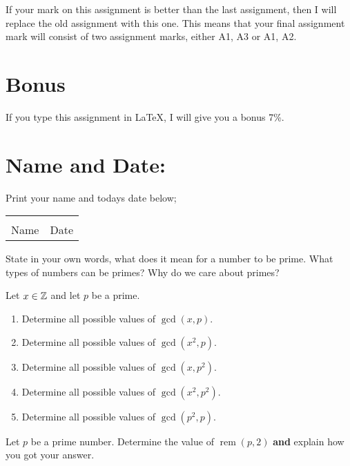 \documentclass[12pt]{article} %
\begin{document}
  If your mark on this assignment is better than the last assignment, then I will replace the old assignment with
  this one. This means that your final assignment mark will consist of two assignment marks, either A1, A3 or A1,
  A2.

  \section{Bonus}
  If you type this assignment in \LaTeX, I will give you a bonus 7\%.
  
\section{Name and Date:}
	Print your name and todays date below;\\


	\begin{center}
	\noindent\begin{tabular}{ll}
		\makebox[3in]{\hrulefill} & \makebox[3in]{\hrulefill}\\
		Name & Date\\[8ex]%
	\end{tabular}
	\end{center}
	\newpage

  \begin{qstn}
    State in your own words, what does it mean for a number to be prime. What types of numbers can be primes? Why
    do we care about primes?
  \end{qstn}

  \begin{qstn}
    Let $x \in \mathbb Z$ and let $p$ be a prime.
    \begin{enumerate}[label=(\alph*)]
      \item Determine all possible values of $\gcd (x,p)$.
      \item Determine all possible values of $\gcd (x^2,p)$.
      \item Determine all possible values of $\gcd (x,p^2)$.
      \item Determine all possible values of $\gcd (x^2,p^2)$.
      \item Determine all possible values of $\gcd (p^2,p)$.
    \end{enumerate}
  \end{qstn}

  \begin{qstn}
    Let $p$ be a prime number. Determine the value of $ \operatorname{rem}(p,2)$ \textbf{and} explain how you got
    your answer.
  \end{qstn}
  
\end{document}
